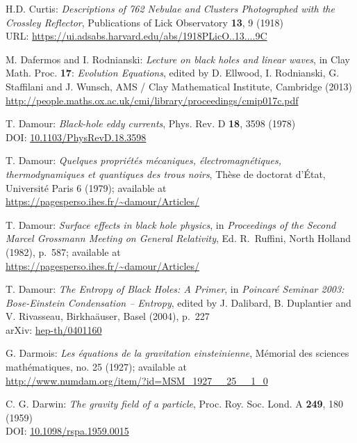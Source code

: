 \begin{thebibliography}{123}
H.D. Curtis:
{\em Descriptions of 762 Nebulae and Clusters Photographed with the Crossley Reflector},
Publications of Lick Observatory {\bf 13}, 9 (1918)\\
URL: \url{https://ui.adsabs.harvard.edu/abs/1918PLicO..13....9C}

M. Dafermos and I. Rodnianski: {\em Lecture on black holes and linear waves},
in  Clay Math. Proc. {\bf 17}: {\em Evolution Equations}, edited by
D. Ellwood, I. Rodnianski, G. Staffilani and J. Wunsch, AMS / Clay Mathematical Institute,
Cambridge (2013) \\
\url{http://people.maths.ox.ac.uk/cmi/library/proceedings/cmip017c.pdf}

T. Damour: {\em Black-hole eddy currents},
Phys. Rev. D {\bf 18}, 3598 (1978)\\
DOI: \href{https://doi.org/10.1103/PhysRevD.18.3598}{10.1103/PhysRevD.18.3598}

T. Damour: {\em Quelques propri\'et\'es m\'ecaniques, \'electromagn\'etiques,
thermo\-dy\-na\-mi\-ques et quantiques des trous noirs},
Th\`ese de doctorat d'\'Etat, Universit\'e Paris 6 (1979); available at\\
\url{https://pagesperso.ihes.fr/~damour/Articles/}

T. Damour: {\em Surface effects in black hole physics},
in {\em Proceedings of the Second Marcel Grossmann Meeting on General
Relativity}, Ed. R.~Ruffini, North Holland (1982), p.~587; available at\\
\url{https://pagesperso.ihes.fr/~damour/Articles/}

T. Damour: {\em The Entropy of Black Holes: A Primer},
in {\em Poincaré Seminar 2003: Bose-Einstein Condensation -- Entropy},
edited by J. Dalibard, B. Duplantier and V. Rivasseau, Birkha\"auser, Basel (2004),
p.~227\\
arXiv: \href{https://arxiv.org/abs/hep-th/0401160}{hep-th/0401160}

G. Darmois:
{\em Les équations de la gravitation einsteinienne},
Mémorial des sciences mathématiques, no. 25 (1927); available at\\
\url{http://www.numdam.org/item/?id=MSM_1927__25__1_0}

C. G. Darwin: {\em The gravity field of a particle},
Proc. Roy. Soc. Lond. A {\bf 249}, 180 (1959)\\
DOI: \href{https://doi.org/10.1098/rspa.1959.0015}{10.1098/rspa.1959.0015}


\end{thebibliography}
